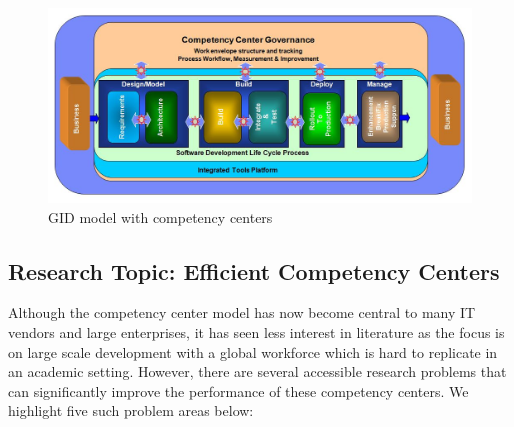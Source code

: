 \begin{figure}[H]
\centering
\includegraphics[bb= 0 0 750 350, scale=0.30]{figs/glocomp.jpg}
\caption{GID model with competency centers}
\label{glofig1}
\end{figure}


\subsection{Research Topic: Efficient Competency Centers}

Although the competency center model has now become central to many IT vendors and large enterprises, it has seen less interest in literature as the focus is on large scale development with a global workforce which is hard to replicate in an academic setting. However, there are several accessible research problems that can significantly improve the performance of these competency centers. We highlight five such problem areas below:

